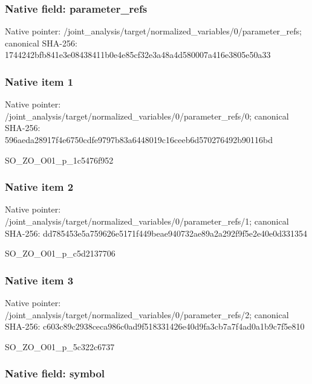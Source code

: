 \documentclass[10pt,a4paper]{article}
\begin{document}
\subsubsection{Native field: parameter\_refs}


Native pointer: /joint\_analysis/target/n\allowbreak{}ormalized\_variables/0/pa\allowbreak{}rameter\_refs; canonical SHA-256: 1744242bfb841e3e08438411\allowbreak{}b0e4e85cf32e3a48a4d58000\allowbreak{}7a416e3805e50a33



\subsubsection{Native item 1}


Native pointer: /joint\_analysis/target/n\allowbreak{}ormalized\_variables/0/pa\allowbreak{}rameter\_refs/0; canonical SHA-256: 596aeda28917f4e6750cdfe9\allowbreak{}797b83a6448019c16ceeb6d5\allowbreak{}70276492b90116bd


SO\_ZO\_O01\_p\_1c5476f952


\subsubsection{Native item 2}


Native pointer: /joint\_analysis/target/n\allowbreak{}ormalized\_variables/0/pa\allowbreak{}rameter\_refs/1; canonical SHA-256: dd785453e5a759626e5171f4\allowbreak{}49beae940732ae89a2a292f9\allowbreak{}f5e2e40e0d331354


SO\_ZO\_O01\_p\_c5d2137706


\subsubsection{Native item 3}


Native pointer: /joint\_analysis/target/n\allowbreak{}ormalized\_variables/0/pa\allowbreak{}rameter\_refs/2; canonical SHA-256: c603c89c2938ceca986c0ad9\allowbreak{}f518331426e40d9fa3cb7a7f\allowbreak{}4ad0a1b9c7f5e810


SO\_ZO\_O01\_p\_5c322c6737


\subsubsection{Native field: symbol}
\end{document}
